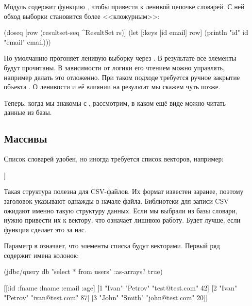 Модуль  содержит функцию , чтобы привести  к ленивой цепочке словарей. С ней обход выборки становится более <<кложурным>>:

\begin{english}
  \begin{clojure}
(doseq [row (resultset-seq ^ResultSet rs)]
  (let [{:keys [id email]} row]
    (println "id" id "email" email)))
  \end{clojure}
\end{english}

По умолчанию  прогоняет ленивую выборку через . В результате все элементы  будут прочитаны. В зависимости от логики его чтением можно управлять, например делать это отложенно. При таком подходе требуется ручное закрытие объекта . О ленивости и её влиянии на результат мы скажем чуть позже.

Теперь, когда мы знакомы с , рассмотрим, в каком ещё виде можно читать данные из базы.

\subsection{Массивы}

Список словарей удобен, но иногда требуется список векторов, например:

\begin{english}
  \begin{clojure}
[[1 "Ivan" "Petrov" "test@test.com"]
 [2 "Ivan" "Petrov" "ivan@test.com"]
 [3 "John" "Smith" "john@test.com"]]
  \end{clojure}
\end{english}


Такая структура полезна для CSV-файлов. Их формат известен заранее, поэтому заголовок указывают однажды в начале файла. Библиотеки для записи CSV ожидают именно такую структуру данных. Если мы выбрали из базы словари, нужно привести их к вектору, что означает лишнюю работу. Будет лучше, если функция  сделает это за нас.

Параметр  в  означает, что элементы списка будут векторами. Первый ряд содержит имена колонок:

\begin{english}
  \begin{clojure}
(jdbc/query db "select * from users" {:as-arrays? true})

[[:id :fname :lname :email :age]
 [1 "Ivan" "Petrov" "test@test.com" 42]
 [2 "Ivan" "Petrov" "ivan@test.com" 87]
 [3 "John" "Smith" "john@test.com" 20]]
  \end{clojure}
\end{english}

